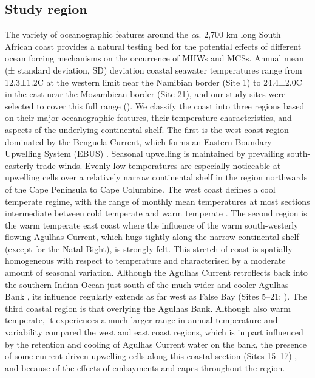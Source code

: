 \documentclass[a4paper,10pt,review]{elsarticle}
\begin{document}
\subsection{Study region}
The variety of oceanographic features around the \emph{ca}. 2,700 km long South African coast provides a natural testing bed for the potential effects of different ocean forcing mechanisms on the occurrence of MHWs and MCSs. Annual mean (± standard deviation, SD) deviation coastal seawater temperatures range from 12.3±1.2\degree C at the western limit near the Namibian border (Site 1) to 24.4±2.0\degree C in the east near the Mozambican border (Site 21), and our study sites were selected to cover this full range (). We classify the coast into three regions based on their major oceanographic features, their temperature characteristics, and aspects of the underlying continental shelf. The first is the west coast region dominated by the Benguela Current, which forms an Eastern Boundary Upwelling System (EBUS) \citep{Hutchings2009}. Seasonal upwelling is maintained by prevailing south-easterly trade winds. Evenly low temperatures are especially noticeable at upwelling cells over a relatively narrow continental shelf in the region northwards of the Cape Peninsula to Cape Columbine. The west coast defines a cool temperate regime, with the range of monthly mean temperatures at most sections intermediate between cold temperate and warm temperate \citep{Luning1990}. The second region is the warm temperate \citep{Luning1990} east coast where the influence of the warm south-westerly flowing Agulhas Current, which hugs tightly along the narrow continental shelf (except for the Natal Bight), is strongly felt. This stretch of coast is spatially homogeneous with respect to temperature and characterised by a moderate amount of seasonal variation. Although the Agulhas Current retroflects back into the southern Indian Ocean \citep{Hutchings2009} just south of the much wider and cooler Agulhas Bank \citep{Roberts2005}, its influence regularly extends as far west as False Bay (Sites 5--21; ). The third coastal region is that overlying the Agulhas Bank. Although also warm temperate, it experiences a much larger range in annual temperature and variability compared the west and east coast regions, which is in part influenced by the retention and cooling of Agulhas Current water on the bank, the presence of some current-driven upwelling cells along this coastal section (Sites 15--17) \citep{Roberts2005}, and because of the effects of embayments and capes throughout the region.
\end{document}
